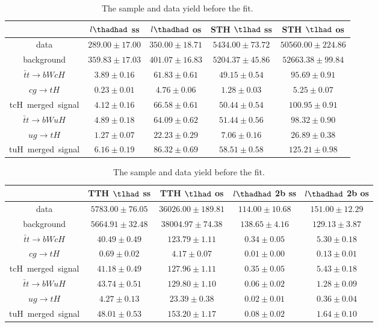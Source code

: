 \begin{table}
\caption{The sample and data yield before the fit.}
\centering
\begin{tabular}{|c|c|c|c|c|} \hline
 & $l\thadhad$ ss & $l\thadhad$ os & STH $\tlhad$ ss & STH $\tlhad$ os\\\hline
data & $289.00\pm17.00$ & $350.00\pm18.71$ & $5434.00\pm73.72$ & $50560.00\pm224.86$\\\hline
background & $359.83\pm17.03$ & $401.07\pm16.83$ & $5204.37\pm45.86$ & $52663.38\pm99.84$\\\hline
$\bar{t}t\to bWcH$ & $3.89\pm0.16$ & $61.83\pm0.61$ & $49.15\pm0.54$ & $95.69\pm0.91$\\\hline
$cg\to tH$ & $0.23\pm0.01$ & $4.76\pm0.06$ & $1.28\pm0.03$ & $5.25\pm0.07$\\\hline
tcH~merged~signal & $4.12\pm0.16$ & $66.58\pm0.61$ & $50.44\pm0.54$ & $100.95\pm0.91$\\\hline
$\bar{t}t\to bWuH$ & $4.89\pm0.18$ & $64.09\pm0.62$ & $51.44\pm0.56$ & $98.32\pm0.90$\\\hline
$ug\to tH$ & $1.27\pm0.07$ & $22.23\pm0.29$ & $7.06\pm0.16$ & $26.89\pm0.38$\\\hline
tuH~merged~signal & $6.16\pm0.19$ & $86.32\pm0.69$ & $58.51\pm0.58$ & $125.21\pm0.98$\\\hline
\end{tabular}
\begin{tabular}{|c|c|c|c|c|} \hline
 & TTH $\tlhad$ ss & TTH $\tlhad$ os & $l\thadhad$ 2b ss & $l\thadhad$ 2b os\\\hline
data & $5783.00\pm76.05$ & $36026.00\pm189.81$ & $114.00\pm10.68$ & $151.00\pm12.29$\\\hline
background & $5664.91\pm32.48$ & $38004.97\pm74.38$ & $138.65\pm4.16$ & $129.13\pm3.87$\\\hline
$\bar{t}t\to bWcH$ & $40.49\pm0.49$ & $123.79\pm1.11$ & $0.34\pm0.05$ & $5.30\pm0.18$\\\hline
$cg\to tH$ & $0.69\pm0.02$ & $4.17\pm0.07$ & $0.01\pm0.00$ & $0.13\pm0.01$\\\hline
tcH~merged~signal & $41.18\pm0.49$ & $127.96\pm1.11$ & $0.35\pm0.05$ & $5.43\pm0.18$\\\hline
$\bar{t}t\to bWuH$ & $43.74\pm0.51$ & $129.80\pm1.10$ & $0.06\pm0.02$ & $1.28\pm0.09$\\\hline
$ug\to tH$ & $4.27\pm0.13$ & $23.39\pm0.38$ & $0.02\pm0.01$ & $0.36\pm0.04$\\\hline
tuH~merged~signal & $48.01\pm0.53$ & $153.20\pm1.17$ & $0.08\pm0.02$ & $1.64\pm0.10$\\\hline

\end{tabular}
\end{table}
